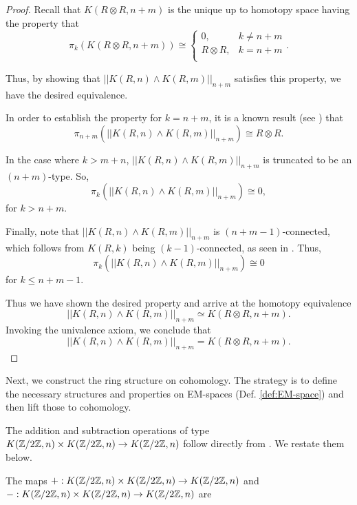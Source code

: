 \documentclass{amsart}
\begin{document}
\begin{proof}
	Recall that $K(R \otimes R, n+m)$ is the unique up to homotopy space
	having the property that
	\[
	\pi_k (K(R \otimes R, n+m )) \cong
	\begin{cases}
	0, & k \neq n+m \\
	R \otimes R, & k= n+m \\
	\end{cases}
	.\]
	
	Thus, by showing that $ || K(R,n) \wedge K(R,m) ||_{n+m} $
	satisfies this property, we have the desired
	equivalence. 
	
	In order to establish the property for $k=n+m$, it is a known result (see \cite[Prop 19.60]{strom:mcht}) that
	\[
	\pi_{n+m} ( || K(R,n) \wedge K(R,m) ||_{n+m} )
	\cong R \otimes R.
	\]
	
	In the case where $k>m+n$, 
	 $ || K(R,n) \wedge K(R,m) ||_{n+m} $
	is truncated to be an $ ( n+m ) $-type. So, \[
	\pi_k ( || K(R,n) \wedge K(R,m) ||_{n+m} )
	\cong 0,
	\] for $k>n+m$. 
	
	Finally, note that  
	$ || K(R,n) \wedge K(R,m) ||_{n+m} $ is
	$ ( n+m-1 ) $-connected, which follows from $ K( R,k ) $ being
	$ ( k-1 ) $-connected, as seen in \cite[Prop 4.3.1]{brunerie:thesis}.
	Thus,
	\[
	\pi_k (|| K(R,n) \wedge K(R,m) ||_{n+m} ) \cong 0
	\]
	for $ k \leq n+m-1 $.
	
	Thus we have shown the desired property and arrive at the homotopy equivalence 
	\[
	|| K(R,n) \wedge K(R,m) ||_{n+m} \simeq
	K (R \otimes R, n+m ).
	\]
	Invoking the univalence axiom, we conclude that
	\[
	|| K(R,n) \wedge K(R,m) ||_{n+m} =
	K (R \otimes R, n+m ).
	\]
\end{proof}



Next, we construct the ring structure on cohomology. The
strategy is to define the necessary structures and properties on EM-spaces (Def. \ref{def:EM-space})
and then lift those to cohomology.



The addition and subtraction
operations of type $ K(\mathbb{Z}/2\mathbb{Z},n) \times K(\mathbb{Z}/2\mathbb{Z},n) \to K(\mathbb{Z}/2\mathbb{Z},n) $ follow
directly from \cite{brunerie:thesis}. We restate them below.


\begin{proposition}\cite[Prop. 5.1.4]{brunerie:thesis}
	The maps $ +: K(\mathbb{Z}/2\mathbb{Z},n) \times K(\mathbb{Z}/2\mathbb{Z},n) \to K(\mathbb{Z}/2\mathbb{Z},n) $ and $-: K(\mathbb{Z}/2\mathbb{Z},n) \times K(\mathbb{Z}/2\mathbb{Z},n) \to K(\mathbb{Z}/2\mathbb{Z},n) $ are 
	
	\end{proposition}
\end{document}
